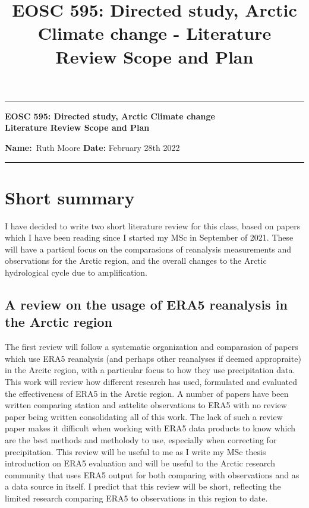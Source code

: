 \documentclass[11pt, oneside]{article}
\title{EOSC 595: Directed study, Arctic Climate change - Literature Review Scope and Plan  }
\begin{document}
\begin{center}
	\hrule
	\vspace{.4cm}
	{\textbf { \large EOSC 595: Directed study, Arctic Climate change \\ Literature Review Scope and Plan}}
\end{center}
{\textbf{Name:}\ Ruth Moore \hspace{\fill} }\textbf{Date:} February 28th 2022   \\
	\hrule


\hfill
\hfill
 \hfill
\hfill

\section{Short summary}
I have decided to write two short literature review for this class, based on papers which I have been reading since I started my MSc in September of 2021. These will  have a particul focus on the comparasions of reanalysis measurements and observations for the Arctic region, and the overall changes to the Arctic hydrological cycle due to amplification. 


\subsection{A review on the usage of ERA5 reanalysis in the Arctic region}
The first review will follow a systematic organization and comparasion of papers which use ERA5 reanalysis (and perhaps other reanalyses if deemed appropraite) in the Arcitc region, with a particular focus to how they use precipitation data. This work will review how different research has used, formulated and evaluated the effectiveness of ERA5 in the Arctic region. A number of papers have been written comparing station and sattelite observations to ERA5 with no review paper being written consolidating all of this work. The lack of such a review paper makes it difficult when working with ERA5 data products to know which are the best methods and metholody to use, especially when correcting for precipitation. This review will be useful to me as I write my MSc thesis introduction on ERA5 evaluation and will be useful to the Arctic research community that uses ERA5 output for both comparing with observations and as a data source in itself. I predict that this review will be short, reflecting the limited research comparing ERA5 to observations in this region to date.
\end{document}
